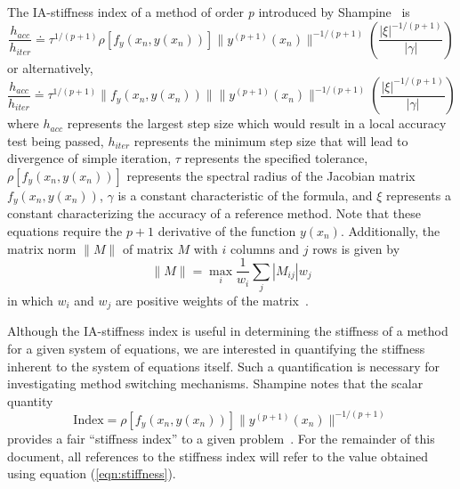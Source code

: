 \documentclass[12pt]{ussci}
\begin{document}
The IA-stiffness index of a method of order \textit{p} introduced by Shampine~\cite{Shampine1982} is
\begin{equation}
    \frac{h_{acc}}{h_{iter}} \doteq \tau ^ {1/(p + 1)} \rho [f_y(x_n,y(x_n))] \|y^{(p+1)}(x_n)\|^{-1/(p+1)} \left( \frac{|\xi|^{-1/(p+1)}}{|\gamma|} \right)
\end{equation}
or alternatively,
\begin{equation}
    \frac{h_{acc}}{h_{iter}} \doteq \tau ^ {1/(p + 1)} \|f_y(x_n,y(x_n))\|\|y^{(p+1)}(x_n)\|^{-1/(p+1)} \left( \frac{|\xi|^{-1/(p+1)}}{|\gamma|} \right)
\end{equation}
where $h_{acc}$ represents the largest step size which would result in a local accuracy test being passed, $h_{iter}$ represents the minimum step size that will lead to divergence of simple iteration, $\tau$ represents the specified tolerance, $\rho [f_y(x_n,y(x_n))]$ represents the spectral radius of the Jacobian matrix $f_y(x_n,y(x_n))$, $\gamma$ is a constant characteristic of the formula, and $\xi$ represents a constant characterizing the accuracy of a reference method.
Note that these equations require the $p+1$ derivative of the function $y(x_n)$.
Additionally, the matrix norm $\|M\|$ of matrix $M$ with $i$ columns and $j$ rows is given by
\begin{equation}
    \|M\| = \max_{i} \frac{1}{w_i} \sum_{j} |M_{ij}|w_j
\end{equation}
in which \(w_i\) and \(w_j\) are positive weights of the matrix~\cite{Shampine1985}.

Although the IA-stiffness index is useful in determining the stiffness of a method for a given system of equations, we are interested in quantifying the stiffness inherent to the system of equations itself.
Such a quantification is necessary for investigating method switching mechanisms.
Shampine notes that the scalar quantity
\begin{equation}\label{eqn:stiffness}
    \textrm{Index} = \rho [f_y(x_n,y(x_n))] \|y^{(p+1)}(x_n)\|^{-1/(p+1)}
\end{equation}
provides a fair ``stiffness index'' to a given problem~\cite{Shampine1985}. For the remainder of this document, all references to the stiffness index will refer to the value obtained using equation (\ref{eqn:stiffness}).
\end{document}
